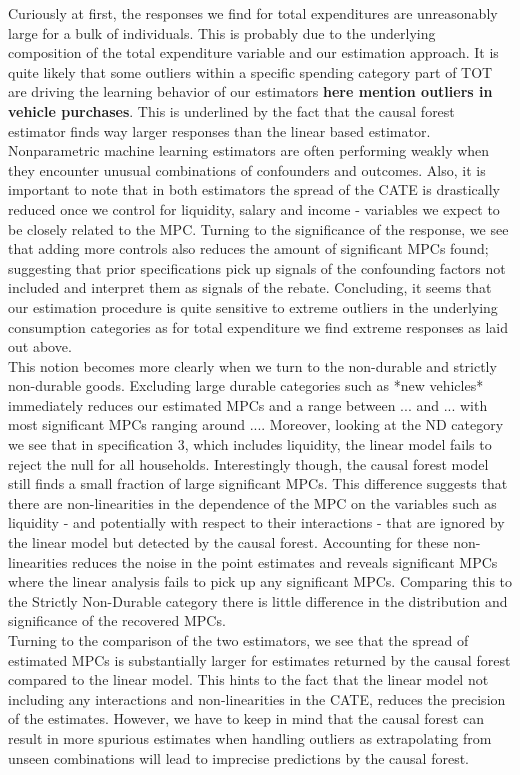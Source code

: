 Curiously at first, the responses we find for total expenditures are unreasonably large for a bulk of individuals. This is probably due to the underlying composition of the total expenditure variable and our estimation approach. It is quite likely that some outliers within a specific spending category part of TOT are driving the learning behavior of our estimators \textbf{here mention outliers in vehicle purchases}. This is underlined by the fact that the causal forest estimator finds way larger responses than the linear based estimator. Nonparametric machine learning estimators are often performing weakly when they encounter unusual combinations of confounders and outcomes.  Also, it is important to note that in both estimators the spread of the CATE is drastically reduced once we control for liquidity, salary and income - variables we expect to be closely related to the MPC. Turning to the significance of the response, we see that adding more controls also reduces the amount of significant MPCs found; suggesting that prior specifications pick up signals of the confounding factors not included and interpret them as signals of the rebate. Concluding, it seems that our estimation procedure is quite sensitive to extreme outliers in the underlying consumption categories as for total expenditure we find extreme responses as laid out above. \\
This notion becomes more clearly when we turn to the non-durable and strictly non-durable goods. Excluding large durable categories such as *new vehicles* immediately reduces our estimated MPCs and a range between ... and ... with most significant MPCs ranging around .... Moreover, looking at the ND category we see that in specification 3, which includes liquidity, the linear model fails to reject the null for all households. Interestingly though, the causal forest model still finds a small fraction of large significant MPCs. This difference suggests that there are non-linearities in the dependence of the MPC on the variables such as liquidity - and potentially with respect to their interactions - that are ignored by the linear model but detected by the causal forest. Accounting for these non-linearities reduces the noise in the point estimates and reveals significant MPCs where the linear analysis fails to pick up any significant MPCs. Comparing this to the Strictly Non-Durable category there is little difference in the distribution and significance of the recovered MPCs. \\
Turning to the comparison of the two estimators, we see that the spread of estimated MPCs is substantially larger for estimates returned by the causal forest compared to the linear model. This hints to the fact that the linear model not including any interactions and non-linearities in the CATE, reduces the precision of the estimates. However, we have to keep in mind that the causal forest can result in more spurious estimates when handling outliers as extrapolating from unseen combinations will lead to imprecise predictions by the causal forest. \\
